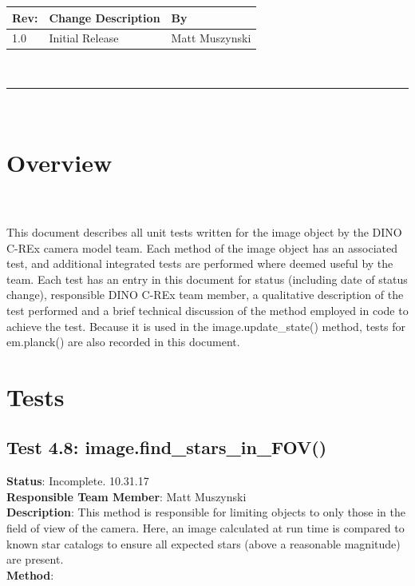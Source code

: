 \documentclass[]{DINOReportMemo}
\begin{document}
\makeCover


%
%
\pagestyle{empty}
{\renewcommand{\arraystretch}{2}
\noindent
\begin{longtable}{|p{0.5in}|p{4.5in}|p{1.14in}|}
\hline
{\bfseries Rev}: & {\bfseries Change Description} & {\bfseries By} \\
\hline
1.0 & Initial Release & Matt Muszynski \\ %
\hline

\end{longtable}
}

\newpage
\setcounter{page}{1}
\pagestyle{fancy}

\tableofcontents
~\\ \hrule ~\\

\newpage
\section{Overview}\\\\
This document describes all unit tests written for the image object by the DINO C-REx camera model team. Each method of the image object has an associated test, and additional integrated tests are performed where deemed useful by the team. Each test has an entry in this document for status (including date of status change), responsible DINO C-REx team member, a qualitative description of the test performed and a brief technical discussion of the method employed in code to achieve the test. Because it is used in the image.update\_state() method, tests for em.planck() are also recorded in this document.

\section{Tests}
\subsection{Test 4.8: image.find\_stars\_in\_FOV()}
\textbf{Status}: Incomplete. 10.31.17\\
\textbf{Responsible Team Member}: Matt Muszynski \\
\textbf{Description}: This method is responsible for limiting objects to only those in the field of view of the camera. Here, an image calculated at run time is compared to known star catalogs to ensure all expected stars (above a reasonable magnitude) are present.\\
\textbf{Method}: \\
\end{document}

